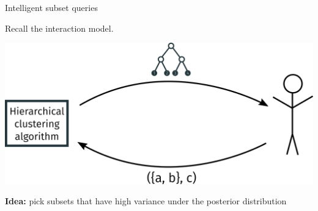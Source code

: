 \documentclass[10pt, compress]{beamer}
\begin{document}
\appendix
\begin{frame}{Intelligent subset queries}

  Recall the interaction model.

  \begin{center}
    \includegraphics[width=\textwidth]{img/interaction-3}
  \end{center}

  \pause



  \textbf{Idea:}  pick subsets that have high variance
  under the posterior distribution

\end{frame}
\end{document}
